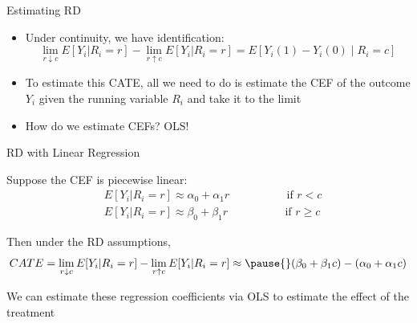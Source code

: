 \documentclass[11pt,english,handout]{beamer}
\newenvironment{wideitemize}{\itemize\addtolength{\itemsep}{10pt}}{\enditemize}
\begin{document}
	
	
\begin{frame}{Estimating RD}
	\begin{itemize}
		\item 
		Under continuity, we have identification:
		$$\lim_{r \downarrow c} E[Y_{i} | R_i = r] - \lim_{r \uparrow c} E[Y_{i} | R_i = r]= E[Y_i(1)-Y_i(0)\mid R_i=c]$$ 
		
		\pause
		\item
		To estimate this CATE, all we need to do is estimate the CEF of the outcome $Y_i$ given the running variable $R_i$ and take it to the limit\bigskip
		
		\pause
		\item
		How do we estimate CEFs? \pause{} OLS!
	\end{itemize}
\end{frame}

\begin{frame}{RD with Linear Regression}
	\begin{wideitemize}
		\item
		Suppose the CEF is piecewise linear:
		\begin{align*}
			& E[Y_i | R_i = r] \approx \alpha_0 + \alpha_1 r  \hspace{2cm} \text{ if } r <c \\
			& E[Y_i | R_i = r] \approx \beta_0 + \beta_1 r \hspace{2cm} \text{ if }  r \geq c
		\end{align*}
	
	\pause
	\item
	Then under the RD assumptions, 
	$$CATE = \lim_{r \downarrow c} E[Y_{i} | R_i = r] - \lim_{r \uparrow c} E[Y_{i} | R_i = r] \approx \pause{} (\beta_0 + \beta_1 c) - (\alpha_0 + \alpha_1 c) $$
	\pause
	\item
	We can estimate these regression coefficients via OLS to estimate the effect of the treatment
	\end{wideitemize}
\end{frame}
\end{document}
